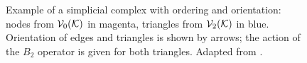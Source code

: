 \begin{figure}[t]
      \caption{ Example of a simplicial complex with ordering and orientation: nodes from \( \mathcal{V}_{0}(\mathcal{K}) \) in magenta, triangles from \( \mathcal{V}_{2}(\mathcal{K}) \) in blue. Orientation of edges and triangles is shown by arrows; the action of the \( B_2 \) operator is given for both triangles. Adapted from \cite{savostianov2024cholesky}. \label{fig:orientation}}
\end{figure}
